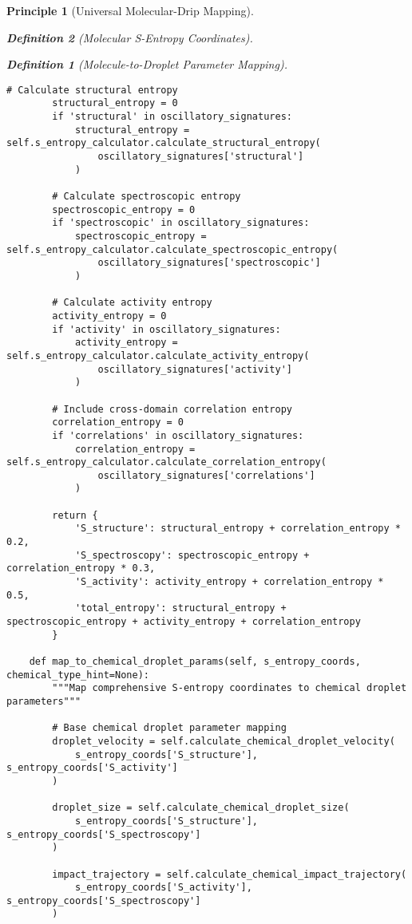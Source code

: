 \documentclass[12pt,a4paper]{article}
\newtheorem{definition}{Definition}
\newtheorem{principle}{Principle}
\begin{document}
\begin{principle}[Universal Molecular-Drip Mapping]
\begin{definition}[Molecular S-Entropy Coordinates]
\begin{definition}[Molecule-to-Droplet Parameter Mapping]
\begin{algorithm}
\begin{algorithmic}[1]
\begin{lstlisting}[style=pythonstyle, caption=Core Molecule-to-Drip Implementation for Comprehensive Chemical Analysis]
        # Calculate structural entropy
        structural_entropy = 0
        if 'structural' in oscillatory_signatures:
            structural_entropy = self.s_entropy_calculator.calculate_structural_entropy(
                oscillatory_signatures['structural']
            )
        
        # Calculate spectroscopic entropy
        spectroscopic_entropy = 0
        if 'spectroscopic' in oscillatory_signatures:
            spectroscopic_entropy = self.s_entropy_calculator.calculate_spectroscopic_entropy(
                oscillatory_signatures['spectroscopic']
            )
        
        # Calculate activity entropy
        activity_entropy = 0
        if 'activity' in oscillatory_signatures:
            activity_entropy = self.s_entropy_calculator.calculate_activity_entropy(
                oscillatory_signatures['activity']
            )
        
        # Include cross-domain correlation entropy
        correlation_entropy = 0
        if 'correlations' in oscillatory_signatures:
            correlation_entropy = self.s_entropy_calculator.calculate_correlation_entropy(
                oscillatory_signatures['correlations']
            )
        
        return {
            'S_structure': structural_entropy + correlation_entropy * 0.2,
            'S_spectroscopy': spectroscopic_entropy + correlation_entropy * 0.3,
            'S_activity': activity_entropy + correlation_entropy * 0.5,
            'total_entropy': structural_entropy + spectroscopic_entropy + activity_entropy + correlation_entropy
        }
    
    def map_to_chemical_droplet_params(self, s_entropy_coords, chemical_type_hint=None):
        """Map comprehensive S-entropy coordinates to chemical droplet parameters"""
        
        # Base chemical droplet parameter mapping
        droplet_velocity = self.calculate_chemical_droplet_velocity(
            s_entropy_coords['S_structure'], s_entropy_coords['S_activity']
        )
        
        droplet_size = self.calculate_chemical_droplet_size(
            s_entropy_coords['S_structure'], s_entropy_coords['S_spectroscopy']
        )
        
        impact_trajectory = self.calculate_chemical_impact_trajectory(
            s_entropy_coords['S_activity'], s_entropy_coords['S_spectroscopy']
        )
        

\end{lstlisting}
\end{algorithmic}
\end{algorithm}
\end{definition}
\end{definition}
\end{principle}
\end{document}
